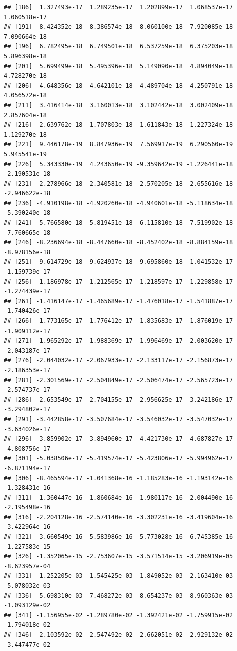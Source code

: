 \documentclass[]{article}
\begin{document}
\begin{verbatim}
## [186]  1.327493e-17  1.289235e-17  1.202899e-17  1.068537e-17  1.060518e-17
## [191]  8.424352e-18  8.386574e-18  8.060100e-18  7.920085e-18  7.090664e-18
## [196]  6.782495e-18  6.749501e-18  6.537259e-18  6.375203e-18  5.896398e-18
## [201]  5.699499e-18  5.495396e-18  5.149090e-18  4.894049e-18  4.728270e-18
## [206]  4.648356e-18  4.642101e-18  4.489704e-18  4.250791e-18  4.056572e-18
## [211]  3.416414e-18  3.160013e-18  3.102442e-18  3.002409e-18  2.857604e-18
## [216]  2.639762e-18  1.707803e-18  1.611843e-18  1.227324e-18  1.129270e-18
## [221]  9.446178e-19  8.847936e-19  7.569917e-19  6.290560e-19  5.945541e-19
## [226]  5.343330e-19  4.243650e-19 -9.359642e-19 -1.226441e-18 -2.190531e-18
## [231] -2.278966e-18 -2.340581e-18 -2.570205e-18 -2.655616e-18 -2.946622e-18
## [236] -4.910198e-18 -4.920260e-18 -4.940601e-18 -5.118634e-18 -5.390240e-18
## [241] -5.766580e-18 -5.819451e-18 -6.115810e-18 -7.519902e-18 -7.760665e-18
## [246] -8.236694e-18 -8.447660e-18 -8.452402e-18 -8.884159e-18 -8.978156e-18
## [251] -9.614729e-18 -9.624937e-18 -9.695860e-18 -1.041532e-17 -1.159739e-17
## [256] -1.186978e-17 -1.212565e-17 -1.218597e-17 -1.229858e-17 -1.274439e-17
## [261] -1.416147e-17 -1.465689e-17 -1.476018e-17 -1.541887e-17 -1.740426e-17
## [266] -1.773165e-17 -1.776412e-17 -1.835683e-17 -1.876019e-17 -1.909112e-17
## [271] -1.965292e-17 -1.988369e-17 -1.996469e-17 -2.003620e-17 -2.043187e-17
## [276] -2.044032e-17 -2.067933e-17 -2.133117e-17 -2.156873e-17 -2.186353e-17
## [281] -2.301569e-17 -2.504849e-17 -2.506474e-17 -2.565723e-17 -2.574737e-17
## [286] -2.653549e-17 -2.704155e-17 -2.956625e-17 -3.242186e-17 -3.294802e-17
## [291] -3.442858e-17 -3.507684e-17 -3.546032e-17 -3.547032e-17 -3.634026e-17
## [296] -3.859902e-17 -3.894960e-17 -4.421730e-17 -4.687827e-17 -4.808756e-17
## [301] -5.038506e-17 -5.419574e-17 -5.423806e-17 -5.994962e-17 -6.871194e-17
## [306] -8.465594e-17 -1.041368e-16 -1.185283e-16 -1.193142e-16 -1.328431e-16
## [311] -1.360447e-16 -1.860684e-16 -1.980117e-16 -2.004490e-16 -2.195498e-16
## [316] -2.204128e-16 -2.574140e-16 -3.302231e-16 -3.419604e-16 -3.422964e-16
## [321] -3.660549e-16 -5.583986e-16 -5.773028e-16 -6.745385e-16 -1.227583e-15
## [326] -1.352065e-15 -2.753607e-15 -3.571514e-15 -3.206919e-05 -8.623957e-04
## [331] -1.252205e-03 -1.545425e-03 -1.849052e-03 -2.163410e-03 -5.078032e-03
## [336] -5.698310e-03 -7.468272e-03 -8.654237e-03 -8.960363e-03 -1.093129e-02
## [341] -1.156955e-02 -1.289780e-02 -1.392421e-02 -1.759915e-02 -1.794018e-02
## [346] -2.103592e-02 -2.547492e-02 -2.662051e-02 -2.929132e-02 -3.447477e-02

\end{verbatim}
\end{document}
